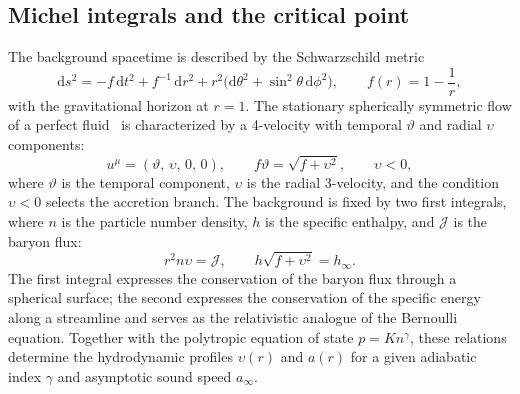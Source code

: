 \documentclass[12pt,a4paper,preprint]{elsarticle}
\begin{document}
        \subsection{Michel integrals and the critical point}\label{subsec:michel-integrals}
            The background spacetime is described by the Schwarzschild metric
            \begin{equation}
                \mathrm{d}s^{2} = -f\,\mathrm{d}t^{2} + f^{-1}\,\mathrm{d}r^{2} + r^{2}\bigl(\mathrm{d}\theta^{2}+\sin^{2}\theta\,\mathrm{d}\phi^{2}\bigr), \qquad f(r) = 1 - \frac{1}{r},
                \label{eq:schwarzschild-metric}
            \end{equation}
            with the gravitational horizon at $r = 1$. The stationary spherically symmetric flow of a perfect fluid~\cite{MichelFC_AccretionOfMatterByCondensedObjects_1972} is characterized by a 4-velocity with temporal $\vartheta$ and radial $\upsilon$ components:
            \begin{equation}
                u^{\mu} = (\vartheta,\,\upsilon,\,0,\,0), \qquad f\vartheta = \sqrt{f + \upsilon^{2}}, \qquad \upsilon < 0,
                \label{eq:four-velocity}
            \end{equation}
            where $\vartheta$ is the temporal component, $\upsilon$ is the radial 3-velocity, and the condition $\upsilon < 0$ selects the accretion branch. The background is fixed by two first integrals, where $n$ is the particle number density, $h$ is the specific enthalpy, and $\mathcal{J}$ is the baryon flux:
            \begin{equation}
                r^{2} n \upsilon = \mathcal{J}, \qquad h\sqrt{f + \upsilon^{2}} = h_{\infty}.
                \label{eq:michel-integrals}
            \end{equation}
            The first integral expresses the conservation of the baryon flux through a spherical surface; the second expresses the conservation of the specific energy along a streamline and serves as the relativistic analogue of the Bernoulli equation. Together with the polytropic equation of state $p = K n^{\gamma}$, these relations determine the hydrodynamic profiles $\upsilon(r)$ and $a(r)$ for a given adiabatic index $\gamma$ and asymptotic sound speed $a_{\infty}$.
            
\end{document}
